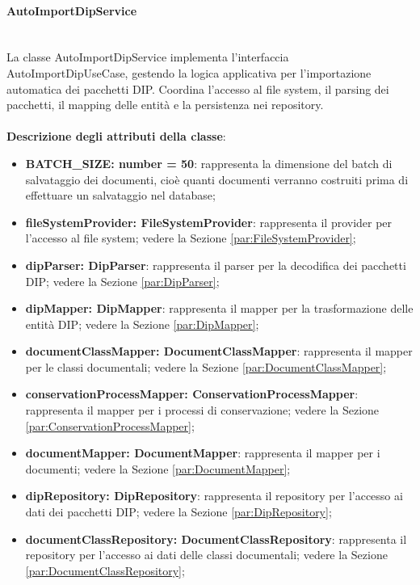 \documentclass[a4paper,12pt]{article}
\begin{document}
{{                \paragraph{AutoImportDipService}\label{par:AutoImportDipService}\mbox{}\\
                La classe AutoImportDipService implementa l'interfaccia AutoImportDipUseCase, gestendo la logica applicativa per l'importazione automatica dei pacchetti DIP. Coordina l'accesso al file system, il parsing dei pacchetti, il mapping delle entità e la persistenza nei repository.\\
                \\
                \textbf{Descrizione degli attributi della classe}:
                \begin{itemize}
                    \item \textbf{BATCH\_SIZE: number = 50}: rappresenta la dimensione del batch di salvataggio dei documenti, cioè quanti documenti verranno costruiti prima di effettuare un salvataggio nel database;
                    \item \textbf{fileSystemProvider: FileSystemProvider}: rappresenta il provider per l'accesso al file system; vedere la Sezione \ref{par:FileSystemProvider};
                    \item \textbf{dipParser: DipParser}: rappresenta il parser per la decodifica dei pacchetti DIP; vedere la Sezione \ref{par:DipParser};
                    \item \textbf{dipMapper: DipMapper}: rappresenta il mapper per la trasformazione delle entità DIP; vedere la Sezione \ref{par:DipMapper};
                    \item \textbf{documentClassMapper: DocumentClassMapper}: rappresenta il mapper per le classi documentali; vedere la Sezione \ref{par:DocumentClassMapper};
                    \item \textbf{conservationProcessMapper: ConservationProcessMapper}: rappresenta il mapper per i processi di conservazione; vedere la Sezione \ref{par:ConservationProcessMapper};
                    \item \textbf{documentMapper: DocumentMapper}: rappresenta il mapper per i documenti; vedere la Sezione \ref{par:DocumentMapper};
                    \item \textbf{dipRepository: DipRepository}: rappresenta il repository per l'accesso ai dati dei pacchetti DIP; vedere la Sezione \ref{par:DipRepository};
                    \item \textbf{documentClassRepository: DocumentClassRepository}: rappresenta il repository per l'accesso ai dati delle classi documentali; vedere la Sezione \ref{par:DocumentClassRepository};

\end{itemize}}}
\end{document}
